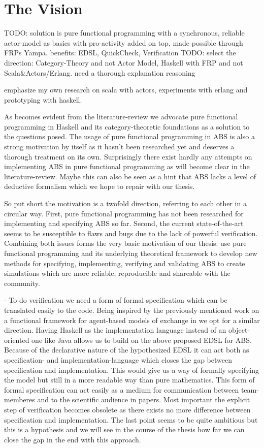 \section{The Vision}
TODO:  solution is pure functional programming with a synchronous, reliable actor-model as basics with pro-activity added on top, made possible through FRPs Yampa. benefits: EDSL, QuickCheck, Verification
TODO: select the direction: Category-Theory and not Actor Model, Haskell with FRP and not Scala\&Actors/Erlang. need a thorough explanation reasoning

emphasize my own research on scala with actors, experiments with erlang and prototyping with haskell.

As becomes evident from the literature-review we advocate pure functional programming in Haskell and its category-theoretic foundations as a solution to the questions posed. The usage of pure functional programming in ABS is also a strong motivation by itself as it hasn't been researched yet and deserves a thorough treatment on its own. Surprisingly there exist hardly any attempts on implementing ABS in pure functional programming as will become clear in the literature-review. Maybe this can also be seen as a hint that ABS lacks a level of deductive formalism which we hope to repair with our thesis. 

So put short the motivation is a twofold direction, referring to each other in a circular way. First, pure functional programming has not been researched for implementing and specifying ABS so far. Second, the current state-of-the-art seems to be susceptible to flaws and bugs due to the lack of powerful verification. Combining both issues forms the very basic motivation of our thesis: use pure functional programming and its underlying theoretical framework to develop new methods for specifying, implementing, verifying and validating ABS to create simulations which are more reliable, reproducible and shareable with the community.

- To do verification we need a form of formal specification which can be translated easily to the code. Being inspired by the previously mentioned work on a functional framework for agent-based models of exchange in \cite{botta_functional_2011} we opt for a similar direction. Having Haskell as the implementation language instead of an object-oriented one like Java allows us to build on the above proposed EDSL for ABS. Because of the declarative nature of the hypothesized EDSL it can act both as specification- and implementation-language which closes the gap between specification and implementation. This would give us a way of formally specifying the model but still in a more readable way than pure mathematics. This form of formal specification can act easily as a medium for communication between team-memberes and to the scientific audience in papers. Most important the explicit step of verification becomes obsolete as there exists no more difference between specification and implementation. The last point seems to be quite ambitious but this is a hypothesis and we will see in the course of the thesis how far we can close the gap in the end with this approach.

